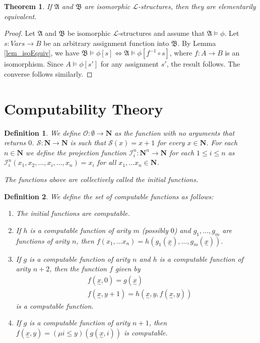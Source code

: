 \documentclass[leqno]{article}
\newtheorem{theorem}{Theorem}[section]
\newtheorem{definition}{Definition}[section]
\newcommand{\N}{\mathbf{N}}
\newcommand{\lang}{\mathcal{L}}
\newcommand{\struct}[1]{\mathfrak{#1}}
\newcommand{\utilde}[1]{\underset{\sim}{#1}}
\newcommand{\prt}[1]{\mathcal{#1}}
\begin{document}
\begin{theorem}
    If $\struct{A}$ and $\struct{B}$ are isomorphic $\lang$-structures, then they are elementarily equivalent.
\end{theorem}

\begin{proof}
   Let $\struct{A}$ and $\struct{B}$ be isomorphic $\lang$-structures and assume that $\struct{A} \models \phi$. Let $s: Vars \to B$ be an arbitrary assignment function into $\struct{B}$. By Lemma \ref{lem_isoEquiv}, we have $\struct{B} \models \phi[s] \iff \struct{A} \models \phi[f^{-1} \circ s]$, where $f:A \to B$ is an isomorphism. Since $A \models \phi[s']$ for any assignment $s'$, the result follows. The converse follows similarly.
\end{proof}



\section{Computability Theory}

\begin{definition}
  We define $\prt{O} : \emptyset \to \N$ as the function with no arguments that returns $0$. $\prt{S} : \N \to \N$ is such that $\prt{S}(x) = x + 1$ for every $x \in \N$. For each $n \in \N$ we define the projection function $\prt{I}^n_i : \N^n \to \N$ for each $1 \leq i \leq n$ as $\prt{I}^n_i(x_1, x_2, \dots, x_i, \dots, x_n) = x_i$ for all $x_1, \dots x_n \in \N$.
  
  The functions above are collectively called the initial functions.
\end{definition}

\begin{definition}
  We define the set of computable functions as follows:
  
  \begin{enumerate}
      \item The initial functions are computable.
      
      \item If $h$ is a computable function of arity $m$ (possibly $0$) and $g_1, \dots, g_m$ are functions of arity $n$, then $f(x_1, \dots x_n) = h(g_1(\utilde{x}), \dots, g_m(\utilde{x}))$.
      
     \item If $g$ is a computable function of arity $n$ and $h$ is a computable function of arity $n+2$, then the function $f$ given by 
     \begin{align*}
         &f(\utilde{x}, 0) = g(\utilde{x}) \\
         &f(\utilde{x}, y+1) = h(\utilde{x}, y, f(\utilde{x}, y))
     \end{align*} is a computable function.
     
     \item If $g$ is a computable function of arity $n+1$, then $f(\utilde{x}, y) = (\mu i \leq y) (g(\utilde{x}, i))$ is computable.
  \end{enumerate}
\end{definition}
\end{document}
